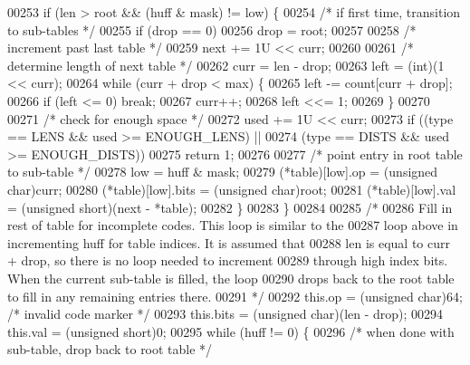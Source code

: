 \begin{DoxyCode}
00253         \textcolor{keywordflow}{if} (len > root && (huff & mask) != low) \{
00254             \textcolor{comment}{/* if first time, transition to sub-tables */}
00255             \textcolor{keywordflow}{if} (drop == 0)
00256                 drop = root;
00257 
00258             \textcolor{comment}{/* increment past last table */}
00259             next += 1U << curr;
00260 
00261             \textcolor{comment}{/* determine length of next table */}
00262             curr = len - drop;
00263             left = (int)(1 << curr);
00264             \textcolor{keywordflow}{while} (curr + drop < max) \{
00265                 left -= count[curr + drop];
00266                 \textcolor{keywordflow}{if} (left <= 0) \textcolor{keywordflow}{break};
00267                 curr++;
00268                 left <<= 1;
00269             \}
00270 
00271             \textcolor{comment}{/* check for enough space */}
00272             used += 1U << curr;
00273             \textcolor{keywordflow}{if} ((type == LENS && used >= ENOUGH\_LENS) ||
00274                 (type == DISTS && used >= ENOUGH\_DISTS))
00275                 \textcolor{keywordflow}{return} 1;
00276 
00277             \textcolor{comment}{/* point entry in root table to sub-table */}
00278             low = huff & mask;
00279             (*table)[low].op = (\textcolor{keywordtype}{unsigned} char)curr;
00280             (*table)[low].bits = (\textcolor{keywordtype}{unsigned} char)root;
00281             (*table)[low].val = (\textcolor{keywordtype}{unsigned} short)(next - *table);
00282         \}
00283     \}
00284 
00285     \textcolor{comment}{/*}
00286 \textcolor{comment}{       Fill in rest of table for incomplete codes.  This loop is similar to the}
00287 \textcolor{comment}{       loop above in incrementing huff for table indices.  It is assumed that}
00288 \textcolor{comment}{       len is equal to curr + drop, so there is no loop needed to increment}
00289 \textcolor{comment}{       through high index bits.  When the current sub-table is filled, the loop}
00290 \textcolor{comment}{       drops back to the root table to fill in any remaining entries there.}
00291 \textcolor{comment}{     */}
00292     this.op = (\textcolor{keywordtype}{unsigned} char)64;                \textcolor{comment}{/* invalid code marker */}
00293     this.bits = (\textcolor{keywordtype}{unsigned} char)(len - drop);
00294     this.val = (\textcolor{keywordtype}{unsigned} short)0;
00295     \textcolor{keywordflow}{while} (huff != 0) \{
00296         \textcolor{comment}{/* when done with sub-table, drop back to root table */}

\end{DoxyCode}

